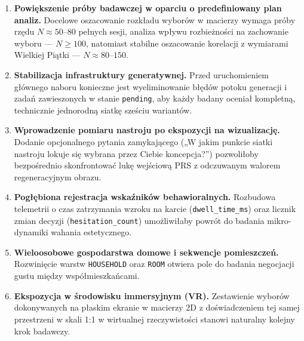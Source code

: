 \begin{enumerate}
  \item \textbf{Powiększenie próby badawczej w oparciu o predefiniowany plan analiz.} Docelowe oszacowanie rozkładu wyborów w macierzy wymaga próby rzędu $N \approx 50$--$80$ pełnych sesji, analiza wpływu rozbieżności na zachowanie wyboru --- $N \geq 100$, natomiast stabilne oszacowanie korelacji z wymiarami Wielkiej Piątki --- $N \approx 80$--$150$.
  \item \textbf{Stabilizacja infrastruktury generatywnej.} Przed uruchomieniem głównego naboru konieczne jest wyeliminowanie błędów potoku generacji i zadań zawieszonych w stanie \texttt{pending}, aby każdy badany oceniał kompletną, technicznie jednorodną siatkę sześciu wariantów.
  \item \textbf{Wprowadzenie pomiaru nastroju po ekspozycji na wizualizację.} Dodanie opcjonalnego pytania zamykającego („W jakim punkcie siatki nastroju lokuje się wybrana przez Ciebie koncepcja?”) pozwoliłoby bezpośrednio skonfrontować lukę wejściową PRS z odczuwanym walorem regeneracyjnym obrazu.
  \item \textbf{Pogłębiona rejestracja wskaźników behawioralnych.} Rozbudowa telemetrii o czas zatrzymania wzroku na karcie (\texttt{dwell\_time\_ms}) oraz licznik zmian decyzji (\texttt{hesitation\_count}) umożliwiłaby powrót do badania mikro-dynamiki wahania estetycznego.
  \item \textbf{Wieloosobowe gospodarstwa domowe i sekwencje pomieszczeń.} Rozwinięcie warstw \texttt{HOUSEHOLD} oraz \texttt{ROOM} otwiera pole do badania negocjacji gustu między współmieszkańcami.
  \item \textbf{Ekspozycja w środowisku immersyjnym (VR).} Zestawienie wyborów dokonywanych na płaskim ekranie w macierzy 2D z doświadczeniem tej samej przestrzeni w skali 1:1 w wirtualnej rzeczywistości stanowi naturalny kolejny krok badawczy.
\end{enumerate}
